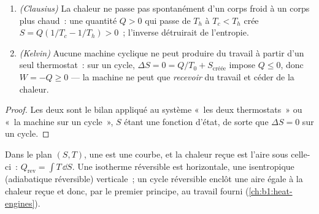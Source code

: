 \begin{proposition}\label{prop:b1:second-law-entropy:clausiuskelvin}
\begin{enumerate}
  \item \emph{(Clausius)} La chaleur ne passe pas spontanément d'un corps
        froid à un corps plus chaud~: une quantité $Q > 0$ qui passe de $T_h$
        à $T_c < T_h$ crée $S = Q(1/T_c - 1/T_h) > 0$~; l'inverse détruirait
        de l'entropie.
  \item \emph{(Kelvin)} Aucune machine cyclique ne peut produire du travail
        à partir d'un seul thermostat~: sur un cycle, $\Delta S = 0 = Q/T_0 + S_{\text{créée}}$
        impose $Q \leq 0$, donc $W = -Q \geq 0$ --- la machine ne peut que
        \emph{recevoir} du travail et céder de la chaleur.
\end{enumerate}
\end{proposition}

\begin{proof}
Les deux sont le bilan appliqué au système «~les deux thermostats~» ou
«~la machine sur un cycle~», $S$ étant une fonction d'état, de sorte que $\Delta S
= 0$ sur un cycle.
\end{proof}

\begin{definition}\label{def:b1:second-law-entropy:TS}
Dans le plan $(S, T)$, une  est une courbe, et la
chaleur reçue est l'aire sous celle-ci~: $Q_{\mathrm{rev}} = \int T\,\dd S$. Une
isotherme réversible est horizontale, une isentropique (adiabatique
réversible) verticale~; un cycle réversible enclôt une aire égale à la
chaleur reçue et donc, par le premier principe, au travail fourni
(\cref{ch:b1:heat-engines}).
\end{definition}

